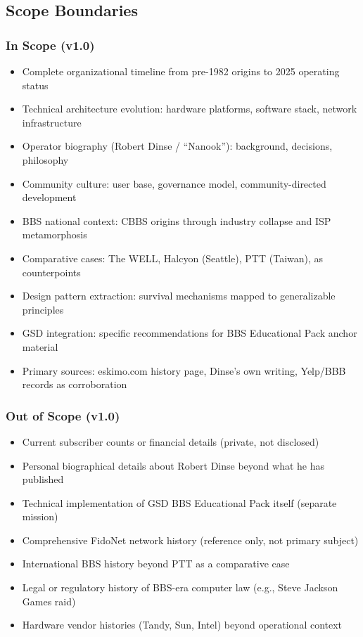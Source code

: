 \documentclass[11pt,letterpaper]{article}
\begin{document}
\subsection{Scope Boundaries}

\subsubsection{In Scope (v1.0)}
\begin{itemize}[leftmargin=1.5em]
  \item Complete organizational timeline from pre-1982 origins to 2025 operating status
  \item Technical architecture evolution: hardware platforms, software stack, network infrastructure
  \item Operator biography (Robert Dinse / ``Nanook''): background, decisions, philosophy
  \item Community culture: user base, governance model, community-directed development
  \item BBS national context: CBBS origins through industry collapse and ISP metamorphosis
  \item Comparative cases: The WELL, Halcyon (Seattle), PTT (Taiwan), as counterpoints
  \item Design pattern extraction: survival mechanisms mapped to generalizable principles
  \item GSD integration: specific recommendations for BBS Educational Pack anchor material
  \item Primary sources: eskimo.com history page, Dinse's own writing, Yelp/BBB records as corroboration
\end{itemize}

\subsubsection{Out of Scope (v1.0)}
\begin{itemize}[leftmargin=1.5em]
  \item Current subscriber counts or financial details (private, not disclosed)
  \item Personal biographical details about Robert Dinse beyond what he has published
  \item Technical implementation of GSD BBS Educational Pack itself (separate mission)
  \item Comprehensive FidoNet network history (reference only, not primary subject)
  \item International BBS history beyond PTT as a comparative case
  \item Legal or regulatory history of BBS-era computer law (e.g., Steve Jackson Games raid)
  \item Hardware vendor histories (Tandy, Sun, Intel) beyond operational context
\end{itemize}
\end{document}
